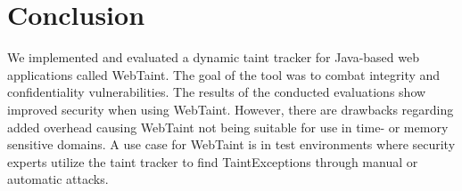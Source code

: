 \chapter{Conclusion}
\label{Conclusion}
We implemented and evaluated a dynamic taint tracker for Java-based web applications called WebTaint. The goal of the tool was to combat integrity and confidentiality vulnerabilities. The results of the conducted evaluations show improved security when using WebTaint. However, there are drawbacks regarding added overhead causing WebTaint not being suitable for use in time- or memory sensitive domains. A use case for WebTaint is in test environments where security experts utilize the taint tracker to find TaintExceptions through manual or automatic attacks.